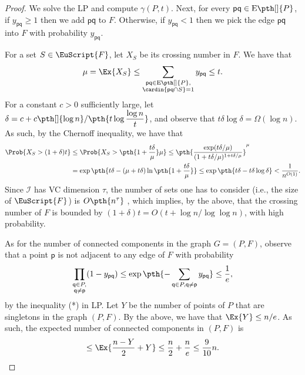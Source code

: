 \documentclass[12pt]{article}
\newcommand{\PntSet}{P}
\newcommand{\pnt}{\mathsf{p}}
\newcommand{\pntA}{\mathsf{q}}
\newcommand{\pairsX}[1]{\mathrm{E}\pth[]{#1}}
\newcommand{\Term}[1]{\textsf{#1}}
\newcommand{\LP}{\Term{L{}P}\xspace}
\newcommand{\VC}{\Term{V{C}}\xspace}
\newcommand{\Family}{\EuScript{F}}
\newcommand{\Dim}{\tau}
\newcommand{\I}{\mathcal{I}}
\begin{document}
\begin{proof}
    We solve the \LP {} and compute $\gamma(\PntSet,
    t)$. Next, for every $\pnt \pntA \in \pairsX{\PntSet}$, if
    $y_{\pnt \pntA} \geq 1$ then we add $\pnt \pntA$ to
    $F$. Otherwise, if $y_{\pnt \pntA} < 1$ then we pick the edge
    $\pnt \pntA$ into $F$ with probability $y_{\pnt\pntA}$.
    
    For a set $S \in \Family$, let $X_S$ be its crossing number in
    $F$.  We have that
    \[
    \mu = \Ex{X_S} \leq \sum_{\substack{\pnt \pntA \in \pairsX{\PntSet},
          \\ \cardin{\pnt\pntA \cap S} = 1}} y_{\pnt\pntA} \leq t.
    \]
    For a constant $c > 0$ sufficiently large, let $\displaystyle
    \delta = c + c \pth[]{ \log n}/\pth{t \log \frac{\log n}{t} }$,
    and observe that $t \delta \log \delta = \Omega( \log n)$. As
    such, by the Chernoff inequality, we have that
    \begin{align*}
        \Prob{X_S > (1+\delta)t }
&\leq \Prob{X_S > \pth{1+\frac{t\delta}{\mu}}\mu } \leq
        \pth{\frac{\exp(t\delta/\mu)}{(1+t\delta/\mu)^{1+t\delta/\mu}}}^\mu
        \\
        & = 
        \exp \pth{t \delta - (\mu + t \delta) \ln \pth{ 1+ \frac{
                 t \delta}{\mu}} }
        \leq 
        \exp \pth{t \delta -  t \delta \log \delta }
        < \frac{1}{n^{O(1)}}.
    \end{align*}
    Since $\I$ has \VC dimension $\Dim$, the number of sets one has to
    consider (i.e., the size of $\Family$) is $O \pth{ n^{\Dim}}$
    \cite{pa-cg-95}, which implies, by the above, that the crossing
    number of $F$ is bounded by $(1+\delta)t = O( t + \log n / \log
    \log n)$, with high probability.

    As for the number of connected components in the graph $G =
    (\PntSet, F)$, observe that a point $\pnt$ is not adjacent to any
    edge of $F$ with probability
    \[    
    \prod_{\substack{ \pntA \in \PntSet,\\ \pntA \ne \pnt}}
    (1 - y_{\pnt\pntA}) 
    \leq \exp \pth{ -\sum_{{ \pntA \in \PntSet, \pntA \ne \pnt}}
        y_{\pnt\pntA}} \leq \frac{1}{e},
    \]
    by the inequality (*) in \LP {}. Let $Y$ be the
    number of points of $\PntSet$ that are singletons in the graph
    $(\PntSet,F)$. By the above, we have that $\Ex{Y} \leq n/e$. As
    such, the expected number of connected components in $(\PntSet,F)$
    is
    \[
    \leq \Ex{\frac{n-Y}{2} + Y} \leq \frac{n}{2} + \frac{n}{e} \leq
    \frac{9}{10} n.
    \]
    \aftermathA
\end{proof}
\end{document}
